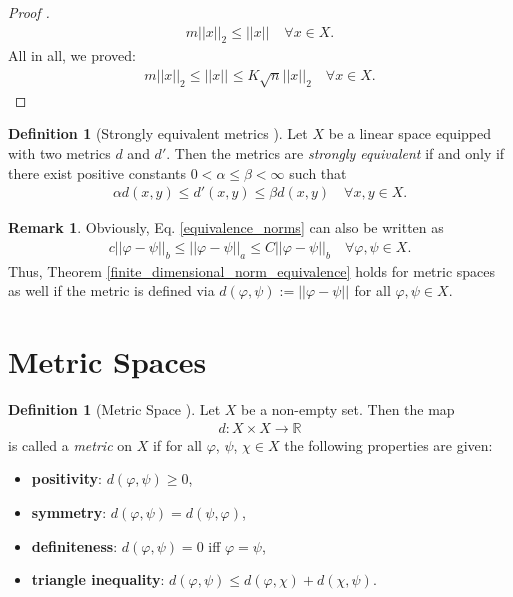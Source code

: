 \documentclass[12pt, a4paper]{article}
\numberwithin{equation}{section}
\theoremstyle{definition}
\theoremstyle{definition}
\newtheorem{defn}[thm]{Definition} %
\newtheorem{remark}[thm]{Remark} %
\newcommand{\norm}[2]{\left\vert\left\vert #1 \right\vert\right\vert_{#2}}
\begin{document}
\begin{proof}[Proof \cite{werner-fa}]
	\begin{align}
		m\norm{x}{2} \leq \norm{x}{} \quad \forall x\in X.
	\end{align}
	All in all, we proved: 
	\begin{align}
		m\norm{x}{2} \leq \norm{x}{} \leq K\sqrt{n}\norm{x}{2} \quad \forall x\in X. 
	\end{align}
	\end{proof} 
	
	\begin{defn}[Strongly equivalent metrics \cite{equivalence-metrics}]\label{defn:strong_equivalence}
		Let $X$ be a linear space equipped with two metrics $d$ and $d'$. Then the metrics are \textit{strongly equivalent} if and only if there exist positive constants $0 < \alpha \leq \beta < \infty$ such that
		\begin{align}
			\alpha d(x, y) \leq d'(x, y) \leq \beta d(x, y) \quad\forall x, y\in X. 
		\end{align}
	\end{defn}
	
	\begin{remark}\label{equivalence_metrics_finite_dimensional}
		Obviously, Eq. \eqref{equivalence_norms} can also be written as 
		\begin{align}
			c\norm{\varphi-\psi}{b} \leq \norm{\varphi-\psi}{a} \leq C\norm{\varphi-\psi}{b} \quad \forall \varphi, \psi\in X. 
		\end{align} 
		Thus, Theorem \ref{finite_dimensional_norm_equivalence} holds for metric spaces as well if the metric is defined via $d(\varphi, \psi) := \norm{\varphi- \psi}{}$ for all $\varphi, \psi\in X$.
	\end{remark}
	
	\newpage 
	\section{Metric Spaces}
	\begin{defn}[Metric Space \cite{fa2019}]\label{defn:metric_space}
		Let $X$ be a non-empty set. Then the map 
		\begin{align*}
			d: X\times X\rightarrow \mathbb R
		\end{align*}
		is called a \textit{metric} on $X$ if for all $\varphi$, $\psi$, $\chi\in X$ the following properties are given: 
		\begin{itemize}
			\item \textbf{positivity}: $d(\varphi, \psi) \geq 0$, 
			\item \textbf{symmetry}: $d(\varphi, \psi) = d(\psi, \varphi)$, 
			\item \textbf{definiteness}: $d(\varphi, \psi) = 0$ iff $\varphi = \psi$, 
			\item \textbf{triangle inequality}: $d(\varphi, \psi) \leq d(\varphi, \chi) + d(\chi, \psi)$. 
		\end{itemize}
	\end{defn}
	
\end{document}
